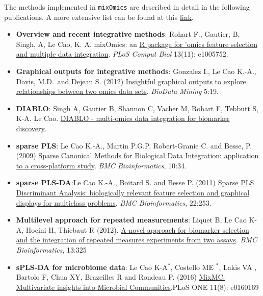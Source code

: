 \documentclass[]{book}
\theoremstyle{definition}
\theoremstyle{definition}
\theoremstyle{definition}
\theoremstyle{remark}
\begin{document}
The methods implemented in \texttt{mixOmics} are described in detail in
the following publications. A more extensive list can be found at this
\href{http://mixomics.org/a-propos/publications/}{link}.

\begin{itemize}
\item
  \textbf{Overview and recent integrative methods}: Rohart F., Gautier,
  B, Singh, A, Le Cao, K. A. mixOmics: an
  \href{http://journals.plos.org/ploscompbiol/article?id=10.1371/journal.pcbi.1005752}{R
  package for 'omics feature selection and multiple data integration}.
  \emph{PLoS Comput Biol} 13(11): e1005752.
\item
  \textbf{Graphical outputs for integrative methods}: \citep{Gon12}
  Gonzalez I., Le Cao K.-A., Davis, M.D.~and Dejean S. (2012)
  \href{https://biodatamining.biomedcentral.com/articles/10.1186/1756-0381-5-19}{Insightful
  graphical outputs to explore relationships between two omics data
  sets}. \emph{BioData Mining} 5:19.
\item
  \textbf{DIABLO}: Singh A, Gautier B, Shannon C, Vacher M, Rohart F,
  Tebbutt S, K-A. Le Cao.
  \href{https://www.biorxiv.org/content/early/2018/03/20/067611}{DIABLO
  - multi-omics data integration for biomarker discovery.}
\item
  \textbf{sparse PLS}: Le Cao K.-A., Martin P.G.P, Robert-Granie C. and
  Besse, P. (2009)
  \href{http://www.biomedcentral.com/1471-2105/10/34/}{Sparse Canonical
  Methods for Biological Data Integration: application to a
  cross-platform study}. \emph{BMC Bioinformatics}, 10:34.
\item
  \textbf{sparse PLS-DA}:Le Cao K.-A., Boitard S. and Besse P. (2011)
  \href{https://bmcbioinformatics.biomedcentral.com/articles/10.1186/1471-2105-12-253}{Sparse
  PLS Discriminant Analysis: biologically relevant feature selection and
  graphical displays for multiclass problems}. \emph{BMC
  Bioinformatics}, 22:253.
\item
  \textbf{Multilevel approach for repeated measurements}: Liquet B, Le
  Cao K-A, Hocini H, Thiebaut R (2012).
  \href{https://bmcbioinformatics.biomedcentral.com/articles/10.1186/1471-2105-13-325}{A
  novel approach for biomarker selection and the integration of repeated
  measures experiments from two assays}. \emph{BMC Bioinformatics},
  13:325
\item
  \textbf{sPLS-DA for microbiome data}: Le Cao K-A\(^*\), Costello ME
  \(^*\), Lakis VA , Bartolo F, Chua XY, Brazeilles R and Rondeau P.
  (2016)
  \href{http://journals.plos.org/plosone/article?id=10.1371/journal.pone.0160169}{MixMC:
  Multivariate insights into Microbial Communities}.PLoS ONE 11(8):
  e0160169
\end{itemize}
\end{document}
